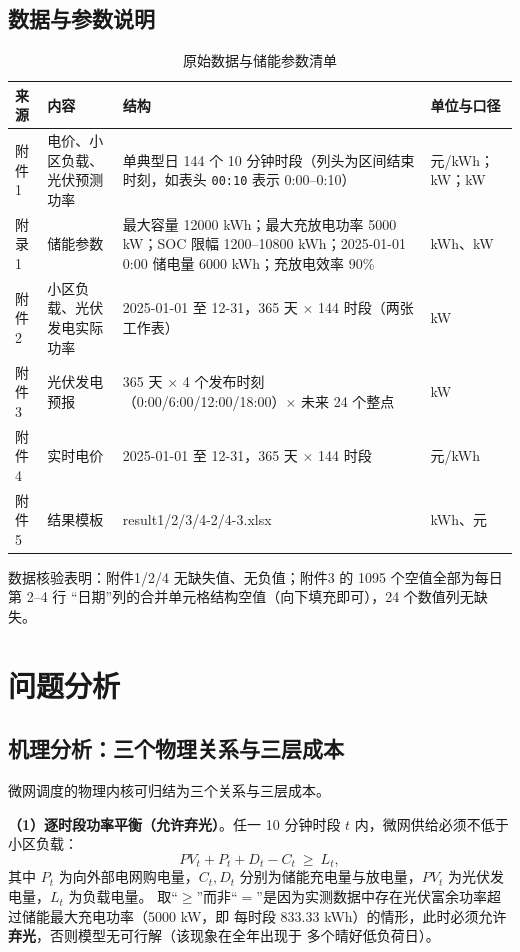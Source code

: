 \documentclass[12pt,a4paper,fontset=fandol]{ctexart}
\begin{document}
\subsection{数据与参数说明}

\begin{table}[htbp]
\centering
\caption{原始数据与储能参数清单}
\label{tab:data}
\begin{tabularx}{\textwidth}{@{}p{1.5cm}p{2.4cm}p{6.2cm}X@{}}
\toprule
来源 & 内容 & 结构 & 单位与口径 \\
\midrule
附件1 & 电价\nobreak、小区负载\nobreak、光伏预测功率 & 单典型日 144 个 10 分钟时段（列头为区间结束时刻\nobreak，如表头 \texttt{00:10} 表示 0:00--0:10\nobreak） & 元/kWh\nobreak；kW\nobreak；kW \\
附录1 & 储能参数 & 最大容量 12000 kWh\nobreak；最大充放电功率 5000 kW\nobreak；SOC 限幅 1200--10800 kWh\nobreak；2025-01-01 0:00 储电量 6000 kWh\nobreak；充放电效率 90\% & kWh\nobreak、kW \\
附件2 & 小区负载\nobreak、光伏发电实际功率 & 2025-01-01 至 12-31\nobreak，365 天 $\times$ 144 时段（两张工作表\nobreak） & kW \\
附件3 & 光伏发电预报 & 365 天 $\times$ 4 个发布时刻（0:00/6:00/12:00/18:00\nobreak）$\times$ 未来 24 个整点 & kW \\
附件4 & 实时电价 & 2025-01-01 至 12-31\nobreak，365 天 $\times$ 144 时段 & 元/kWh \\
附件5 & 结果模板 & result1/2/3/4-2/4-3.xlsx & kWh\nobreak、元 \\
\bottomrule
\end{tabularx}
\end{table}

数据核验表明\nobreak：附件1/2/4 无缺失值\nobreak、无负值\nobreak；附件3 的 1095 个空值全部为每日第 2--4 行
“日期\nobreak”列的合并单元格结构空值（向下填充即可\nobreak）\nobreak，24 个数值列无缺失\nobreak。


\section{问题分析}

\subsection{机理分析\nobreak：三个物理关系与三层成本}

微网调度的物理内核可归结为三个关系与三层成本\cite{ieee_tou,thu_ess}\nobreak。

\textbf{（1\nobreak）逐时段功率平衡（允许弃光\nobreak）}\nobreak。任一 10 分钟时段 $t$ 内\nobreak，微网供给必须不低于小区负载\nobreak：
\begin{equation}
PV_t + P_t + D_t - C_t \ \ge\ L_t ,
\label{eq:balance_general}
\end{equation}
其中 $P_t$ 为向外部电网购电量\nobreak，$C_t,D_t$ 分别为储能充电量与放电量\nobreak，$PV_t$ 为光伏发电量\nobreak，$L_t$ 为负载电量\nobreak。
取“$\ge$\nobreak”而非“$=$\nobreak”是因为实测数据中存在光伏富余功率超过储能最大充电功率（5000 kW\nobreak，即
每时段 833.33 kWh\nobreak）的情形\nobreak，此时必须允许\textbf{弃光}\nobreak，否则模型无可行解（该现象在全年出现于
多个晴好低负荷日\nobreak）\nobreak。
\end{document}
